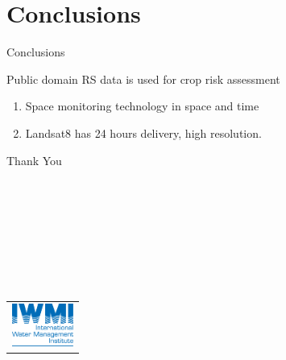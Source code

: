 \documentclass[xcolor=dvipsnames,beamer]{beamer} %
\begin{document}
\section{Conclusions}
\begin{frame}[fragile]{Conclusions}

 Public domain RS data is used for crop risk assessment
\begin{enumerate}
 \item Space monitoring technology in space and time
 \item Landsat8 has 24 hours delivery, high resolution.
\end{enumerate}

\end{frame}

\begin{frame}[fragile]{Thank You}

\ \\
\ \\
\ \\
\ \\
\ \\
\ \\
\ 
\begin{flushright}
\begin{tabular}{r}
\includegraphics[width=2cm]{iwmi}\\
\end{tabular}
\end{flushright}

\end{frame}
\end{document}
